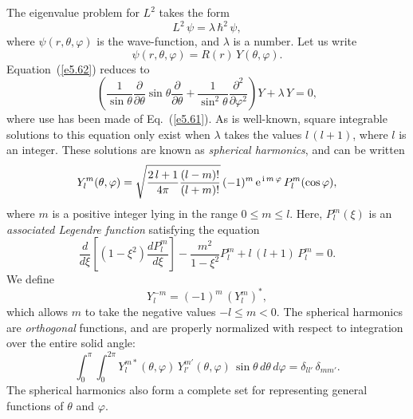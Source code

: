  The eigenvalue problem for
$L^2$ takes the form
\begin{equation}\label{e5.62}
L^2 \,\psi = \lambda \,\hbar^2\, \psi,
\end{equation}
where $\psi(r, \theta, \varphi)$ is the wave-function, and $\lambda$ is a number. 
Let us write
\begin{equation}
\psi(r, \theta, \varphi) = R(r) \,Y(\theta, \varphi).
\end{equation}
Equation~(\ref{e5.62}) reduces to
\begin{equation}
\left( \frac{1}{\sin\theta}\frac{\partial}{\partial\theta}
\sin\theta\frac{\partial}{\partial\theta} + \frac{1}{\sin^2\theta}\frac{\partial^2}
{\partial\varphi^2}\right)Y + \lambda \,Y = 0,
\end{equation}
where use has been made of Eq.~(\ref{e5.61}). As is well-known,
square integrable solutions to this
equation only exist when $\lambda$ takes the values $l\,(l+1)$, where $l$ is
an integer. These solutions are known as {\em spherical harmonics}, and
can be written
\begin{equation}\label{e5.65}
Y_l^m(\theta, \varphi) = \sqrt{ \frac{2\,l+1}{4\pi} \frac{(l-m)!}{(l+m)!}}
\,(-1)^m\, {\rm e}^{\,{\rm i} \,m\,\varphi}\, P_l^m(\cos\varphi),
\end{equation}
where $m$ is a positive  integer lying in the range $0\leq  m\leq l$. Here, 
$P_l^m(\xi)$ is an {\em associated Legendre function} satisfying the
equation
\begin{equation}
\frac{d}{d\xi}\! \left[ (1-\xi^2)\frac{dP_l^m}{d\xi}\right]
- \frac{m^2}{1-\xi^2} P_l^m + l\,(l+1)\,P_l^m = 0.
\end{equation}
We define 
\begin{equation}
Y_l^{-m} = (-1)^m\, (Y^{m}_l)^\ast,
\end{equation}
which allows $m$ to take the negative values $-l\leq m< 0$.
The spherical harmonics are {\em orthogonal} functions, and are 
properly normalized with respect to integration over
the entire solid angle:
\begin{equation}
\int_0^\pi \int_0^{2\pi} Y_l^{m\ast} (\theta,\varphi)\,
Y_{l'}^{m'}(\theta, \varphi) \,\sin\theta\,d\theta\,d\varphi = \delta_{l l'} \,\delta_{m m'}.
\end{equation}
The spherical harmonics also form a complete set for representing general functions
of $\theta$ and $\varphi$. 

